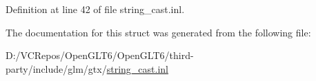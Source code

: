 Definition at line 42 of file string\+\_\+cast.\+inl.



The documentation for this struct was generated from the following file\+:\begin{DoxyCompactItemize}
\item 
D\+:/\+V\+C\+Repos/\+Open\+G\+L\+T6/\+Open\+G\+L\+T6/third-\/party/include/glm/gtx/\mbox{\hyperlink{string__cast_8inl}{string\+\_\+cast.\+inl}}\end{DoxyCompactItemize}
